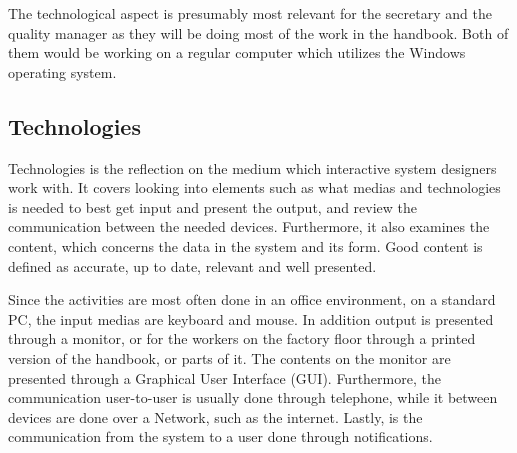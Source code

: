 
The technological aspect is presumably most relevant for the secretary and the quality manager as they will be doing most of the work in the handbook.
Both of them would be working on a regular computer which utilizes the Windows operating system. %

\subsection{Technologies}
Technologies is the reflection on the medium which interactive system designers work with.
It covers looking into elements such as what medias and technologies is needed to best get input and present the output, and review the communication between the needed devices.
Furthermore, it also examines the content, which concerns the data in the system and its form.
Good content is defined as accurate, up to date, relevant and well presented.
\citep{Benyon}

Since the activities are most often done in an office environment, on a standard PC, the input medias are keyboard and mouse.
In addition output is presented through a monitor, or for the workers on the factory floor through a printed version of the handbook, or parts of it.
The contents on the monitor are presented through a Graphical User Interface (GUI).
Furthermore, the communication user-to-user is usually done through telephone, while it between devices are done over a Network, such as the internet.
Lastly, is the communication from the system to a user done through notifications.

